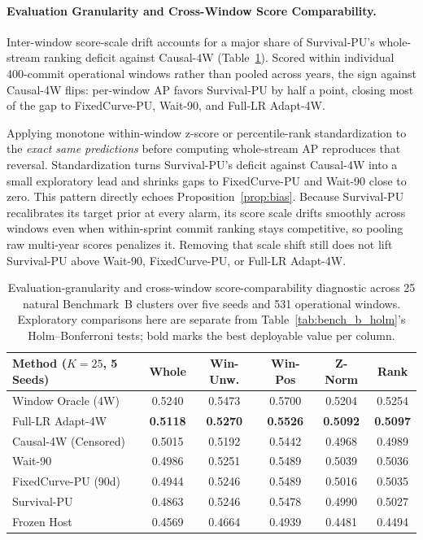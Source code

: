 \documentclass[pdflatex,sn-basic]{sn-jnl}
\theoremstyle{definition}
\theoremstyle{plain}
\begin{document}
\paragraph{Evaluation Granularity and Cross-Window Score Comparability.}
Inter-window score-scale drift accounts for a major share of Survival-PU's whole-stream ranking deficit against Causal-4W (Table~\ref{tab:window_ap_scale}). Scored within individual 400-commit operational windows rather than pooled across years, the sign against Causal-4W flips: per-window AP favors Survival-PU by half a point, closing most of the gap to FixedCurve-PU, Wait-90, and Full-LR Adapt-4W.

Applying monotone within-window z-score or percentile-rank standardization to the \textit{exact same predictions} before computing whole-stream AP reproduces that reversal. Standardization turns Survival-PU's deficit against Causal-4W into a small exploratory lead and shrinks gaps to FixedCurve-PU and Wait-90 close to zero. This pattern directly echoes Proposition~\ref{prop:bias}. Because Survival-PU recalibrates its target prior at every alarm, its score scale drifts smoothly across windows even when within-sprint commit ranking stays competitive, so pooling raw multi-year scores penalizes it. Removing that scale shift still does not lift Survival-PU above Wait-90, FixedCurve-PU, or Full-LR Adapt-4W.

\begin{table}[t]
\centering
\caption{Evaluation-granularity and cross-window score-comparability diagnostic across 25 natural Benchmark~B clusters over five seeds and 531 operational windows. Exploratory comparisons here are separate from Table~\ref{tab:bench_b_holm}'s Holm--Bonferroni tests; bold marks the best deployable value per column.}
\label{tab:window_ap_scale}
\fontsize{7.5}{9.0}\selectfont
\setlength{\tabcolsep}{1.8pt}
\begin{tabular*}{\textwidth}{@{\extracolsep\fill}lccccc@{}}
\toprule
\textbf{Method ($K{=}25$, 5 Seeds)} & \textbf{Whole} & \textbf{Win-Unw.} & \textbf{Win-Pos} & \textbf{Z-Norm} & \textbf{Rank} \\
\midrule
Window Oracle (4W) & 0.5240 & 0.5473 & 0.5700 & 0.5204 & 0.5254 \\
\midrule
Full-LR Adapt-4W & \textbf{0.5118} & \textbf{0.5270} & \textbf{0.5526} & \textbf{0.5092} & \textbf{0.5097} \\
Causal-4W (Censored) & 0.5015 & 0.5192 & 0.5442 & 0.4968 & 0.4989 \\
Wait-90 & 0.4986 & 0.5251 & 0.5489 & 0.5039 & 0.5036 \\
FixedCurve-PU (90d) & 0.4944 & 0.5246 & 0.5489 & 0.5016 & 0.5035 \\
Survival-PU & 0.4863 & 0.5246 & 0.5478 & 0.4990 & 0.5027 \\
Frozen Host & 0.4569 & 0.4664 & 0.4939 & 0.4481 & 0.4494 \\
\bottomrule
\end{tabular*}
\end{table}
\end{document}
